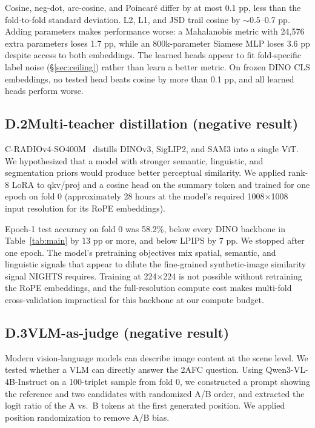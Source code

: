 Cosine, neg-dot, arc-cosine, and Poincar\'e differ by at most 0.1 pp, less than the fold-to-fold standard deviation. L2, L1, and JSD trail cosine by $\sim$0.5--0.7 pp. Adding parameters makes performance worse: a Mahalanobis metric with 24{,}576 extra parameters loses 1.7 pp, while an 800k-parameter Siamese MLP loses 3.6 pp despite access to both embeddings. The learned heads appear to fit fold-specific label noise (\S\ref{sec:ceiling}) rather than learn a better metric. On frozen DINO CLS embeddings, no tested head beats cosine by more than 0.1 pp, and all learned heads perform worse.

\subsection*{D.2\quad Multi-teacher distillation (negative result)}

C-RADIOv4-SO400M~\citep{conwell2024large} distills DINOv3, SigLIP2, and SAM3 into a single ViT. We hypothesized that a model with stronger semantic, linguistic, and segmentation priors would produce better perceptual similarity. We applied rank-8 LoRA to qkv/proj and a cosine head on the summary token and trained for one epoch on fold 0 (approximately 28 hours at the model's required 1008$\times$1008 input resolution for its RoPE embeddings).

Epoch-1 test accuracy on fold 0 was 58.2\%, below every DINO backbone in Table~\ref{tab:main} by 13 pp or more, and below LPIPS by 7 pp. We stopped after one epoch. The model's pretraining objectives mix spatial, semantic, and linguistic signals that appear to dilute the fine-grained synthetic-image similarity signal NIGHTS requires. Training at 224$\times$224 is not possible without retraining the RoPE embeddings, and the full-resolution compute cost makes multi-fold cross-validation impractical for this backbone at our compute budget.

\subsection*{D.3\quad VLM-as-judge (negative result)}

Modern vision-language models can describe image content at the scene level. We tested whether a VLM can directly answer the 2AFC question. Using Qwen3-VL-4B-Instruct on a 100-triplet sample from fold 0, we constructed a prompt showing the reference and two candidates with randomized A/B order, and extracted the logit ratio of the A vs.\ B tokens at the first generated position. We applied position randomization to remove A/B bias.

